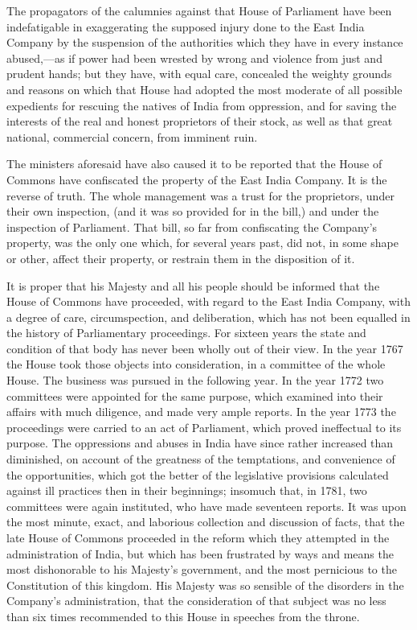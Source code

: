 The propagators of the calumnies against that House of Parliament have been indefatigable in exaggerating the supposed injury done to the East India Company by the suspension of the authorities which they have in every instance abused,—as if power had been wrested by wrong and violence from just and prudent hands; but they have, with equal care, concealed the weighty grounds and reasons on which that House had adopted the most moderate of all possible expedients for rescuing the natives of India from oppression, and for saving the interests of the real and honest proprietors of their stock, as well as that great national, commercial concern, from imminent ruin.

The ministers aforesaid have also caused it to be reported that the House of Commons have confiscated the property of the East India Company. It is the reverse of truth. The whole management was a trust for the proprietors, under their own inspection, (and it was so provided for in the bill,) and under the inspection of Parliament. That bill, so far from confiscating the Company's property, was the only one which, for several years past, did not, in some shape or other, affect their property, or restrain them in the disposition of it.

It is proper that his Majesty and all his people should be informed that the House of Commons have proceeded, with regard to the East India Company, with a degree of care, circumspection, and deliberation, which has not been equalled in the history of Parliamentary proceedings. For sixteen years the state and condition of that body has never been wholly out of their view. In the year 1767 the House took those objects into consideration, in a committee of the whole House. The business was pursued in the following year. In the year 1772 two committees were appointed for the same purpose, which examined into their affairs with much diligence, and made very ample reports. In the year 1773 the proceedings were carried to an act of Parliament, which proved ineffectual to its purpose. The oppressions and abuses in India have since rather increased than diminished, on account of the greatness of the temptations, and convenience of the opportunities, which got the better of the legislative provisions calculated against ill practices then in their beginnings; insomuch that, in 1781, two committees were again instituted, who have made seventeen reports. It was upon the most minute, exact, and laborious collection and discussion of facts, that the late House of Commons proceeded in the reform which they attempted in the administration of India, but which has been frustrated by ways and means the most dishonorable to his Majesty's government, and the most pernicious to the Constitution of this kingdom. His Majesty was so sensible of the disorders in the Company's administration, that the consideration of that subject was no less than six times recommended to this House in speeches from the throne.

